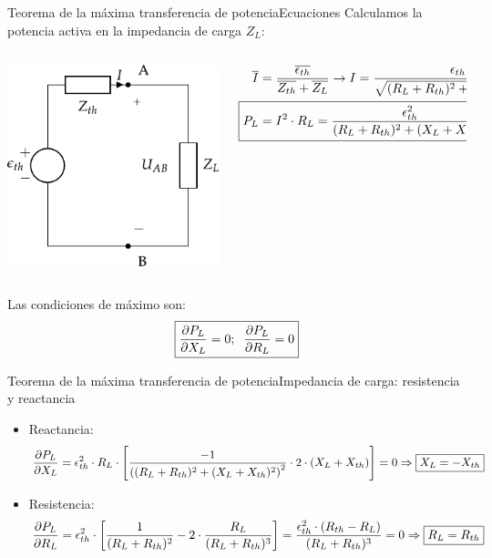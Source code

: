 \documentclass[aspectratio=169, xcolor={usenames,svgnames,dvipsnames}]{beamer}
\begin{document}
\begin{frame}{Teorema de la máxima transferencia de potencia}{Ecuaciones}
Calculamos la potencia activa en la impedancia de carga \(Z_L\):
\begin{columns}
\begin{column}{0.35\columnwidth}
\begin{center}
\includegraphics[height=0.45\textheight]{../figs/EquivalenteThevenin2.pdf}
\end{center}
\end{column}


\begin{column}{0.5\columnwidth}
\begin{align*}
\overline{I} &= \frac{\overline{\epsilon_{th}}}{\overline{Z_{th}} + \overline{Z_L}}\rightarrow I=\frac{\epsilon_{th}}{\sqrt{(R_L+R_{th})^2+(X_L+X_{th})^2}}\\
\Aboxed{P_L &= I^2 \cdot R_L = \dfrac{\epsilon_{th}^2}{{(R_L+R_{th})^2+(X_L+X_{th})^2}} \cdot R_L}
\end{align*}
\end{column}
\end{columns}

Las condiciones de máximo son: 
\[
  \boxed{%
    \diffp{P_L}{X_L} = 0;\;\;    \diffp{P_L}{R_L} = 0
  }
\]
\end{frame}

\begin{frame}{Teorema de la máxima transferencia de potencia}{Impedancia de carga: resistencia y reactancia}
\begin{itemize}
    \item Reactancia: 
    \begin{equation*}
        \diffp{P_L}{X_L} = \epsilon^2_{th} \cdot R_L \cdot \left[\frac{-1}{\left((R_L + R_{th})^2 + (X_L + X_{th})^2\right)^2} \cdot 2 \cdot (X_L + X_{th})\right]=0\Rightarrow \boxed{X_L = - X_{th}}
    \end{equation*}
    \item Resistencia: 
    \begin{equation*}
        \diffp{P_L}{R_L} = \epsilon^2_{th} \cdot \left[\frac{1}{(R_L + R_{th})^2} - 2 \cdot \frac{R_L}{(R_L + R_{th})^3}\right]= \frac{\epsilon^2_{th} \cdot (R_{th} - R_L)}{(R_L + R_{th})^3}=0\Rightarrow \boxed{R_L = R_{th}}
    \end{equation*}
\end{itemize}

\end{frame}
\end{document}
